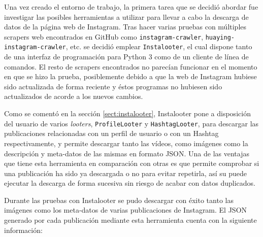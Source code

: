 Una vez creado el entorno de trabajo, la primera tarea que se decidió abordar fue investigar las posibles herramientas a utilizar para llevar a cabo la descarga de datos de la página web de Instagram. Tras hacer varias pruebas con múltiples scrapers web encontrados en GitHub como \texttt{instagram-crawler}, \texttt{huaying-instagram-crawler}, etc. se decidió emplear \texttt{Instalooter}, el cual dispone tanto de una interfaz de programación para Python 3 como de un cliente de línea de comandos. El resto de scrapers encontrados no parecían funcionar en el momento en que se hizo la prueba, posiblemente debido a que la web de Instagram hubiese sido actualizada de forma reciente y éstos programas no hubiesen sido actualizados de acorde a los nuevos cambios.

Como se comentó en la sección \ref{sect:instalooter}, Instalooter pone a disposición del usuario de varios \textit{looters}, \texttt{ProfileLooter} y \texttt{HashtagLooter}, para descargar las publicaciones relacionadas con un perfil de usuario o con un Hashtag respectivamente, y permite descargar tanto las vídeos, como imágenes como la descripción y meta-datos de las mismas en formato JSON. Una de las ventajas que tiene esta herramienta en comparación con otras es que permite comprobar si una publicación ha sido ya descargada o no para evitar repetirla, así su puede ejecutar la descarga de forma sucesiva sin riesgo de acabar con datos duplicados.

Durante las pruebas con Instalooter se pudo descargar con éxito tanto las imágenes como los meta-datos de varias publicaciones de Instagram. El JSON generado por cada publicación mediante esta herramienta cuenta con la siguiente información:

